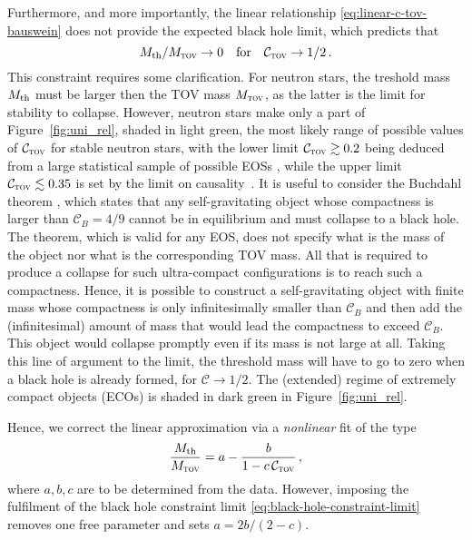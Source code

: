 Furthermore, and more importantly, the linear relationship \eqref{eq:linear-c-tov-bauswein}
does not provide the expected black hole limit, which predicts that
\begin{equation}\label{eq:black-hole-constraint-limit}
{M_{\rm th}}/{M_{\textsc{tov}}}\to0 \quad\text{for}\quad
\mathcal{C}_{\textsc{tov}}\to1/2
\,.
\end{equation}
This constraint requires some clarification. For neutron stars, the treshold mass
${M_{\rm th}}$ must be larger then the TOV mass ${M_{\textsc{tov}}}$, as the latter is the
limit for stability to collapse. However, neutron stars make only a part of
Figure~\ref{fig:uni_rel}, shaded in light green, \ie the most likely range
of possible values of  $\mathcal{C}_{\textsc{tov}}$ for stable neutron
stars, with the lower limit $\mathcal{C}_{\textsc{tov}}\gtrsim0.2$ being
deduced from a large statistical sample of possible EOSs
\cite{Most2018}, while the upper limit $\mathcal{C}_{\textsc{tov}}\lesssim0.35$
is set by the limit on causality~\cite{Koranda1997, Lattimer2016}.
It is useful to consider the Buchdahl theorem \cite{Rezzolla_book:2013},
which states that any self-gravitating object whose compactness is
larger than $\mathcal C_B=4/9$ cannot be in equilibrium and must collapse to a black
hole. The theorem, which is valid for any EOS, does not specify what is
the mass of the object nor what is the corresponding TOV mass. All that
is required to produce a collapse for such ultra-compact configurations
is to reach such a compactness. Hence, it is possible to construct a
self-gravitating object with finite mass whose compactness is only
infinitesimally smaller than $\mathcal C_B$ and then add the (infinitesimal)
amount of mass that would lead the compactness to exceed $\mathcal C_B$. This
object would collapse promptly even if its mass is not large at
all. Taking this line of argument to the limit, the threshold mass will
have to go to zero when a black hole is already formed, \ie for
$\mathcal C \to 1/2$. The (extended) regime of extremely compact objects
(ECOs) is shaded in dark green in Figure~\ref{fig:uni_rel}.

Hence, we correct the linear approximation via a \emph{nonlinear} fit of the type
\begin{equation}
	\label{eq:fit}
	\frac{M_{\rm th}}{M_{\textsc{tov}}} = a - \frac{b}{1 -
		c\,\mathcal{C}_{\textsc{tov}}}\,,
\end{equation} 
where $a,b,c$ are to be determined from the data. However, imposing the
fulfilment of the black hole constraint limit 
\eqref{eq:black-hole-constraint-limit}
removes one free parameter and sets $a=2b/(2-c)$.

